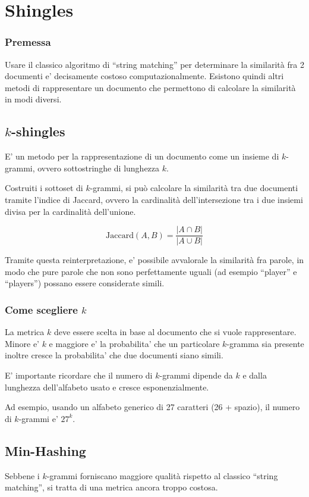 \chapter{Shingles}

  \subsection*{Premessa}
    Usare il classico algoritmo di ``string matching'' per determinare la similarità fra 2 documenti e' decisamente costoso computazionalmente. Esistono quindi altri metodi di rappresentare un documento che permettono di calcolare la similarità in modi diversi.

  \section{$k$-shingles}
    E' un metodo per la rappresentazione di un documento come un insieme di $k$-grammi, ovvero sottostringhe di lunghezza $k$.

    Costruiti i sottoset di $k$-grammi, si può calcolare la similarità tra due documenti tramite l'indice di Jaccard, ovvero la cardinalità dell'intersezione tra i due insiemi divisa per la cardinalità dell'unione.

    $$
      \text{Jaccard}(A, B) = \frac{|A \cap B|}{|A \cup B|}
    $$

    Tramite questa reinterpretazione, e' possibile avvalorale la similarità fra parole, in modo che pure parole che non sono perfettamente uguali (ad esempio ``player'' e ``players'') possano essere considerate simili.

    \subsection{Come scegliere $k$}
      La metrica $k$ deve essere scelta in base al documento che si vuole rappresentare. Minore e' $k$ e maggiore e' la probabilita' che un particolare $k$-gramma sia presente inoltre cresce la probabilita' che due documenti siano simili.

      E' importante ricordare che il numero di $k$-grammi dipende da $k$ e dalla lunghezza dell'alfabeto usato e cresce esponenzialmente.

      Ad esempio, usando un alfabeto generico di 27 caratteri (26 + spazio), il numero di $k$-grammi e' $27^k$.

  \section{Min-Hashing}
    Sebbene i $k$-grammi forniscano maggiore qualità rispetto al classico ``string matching'', si tratta di una metrica ancora troppo costosa.

